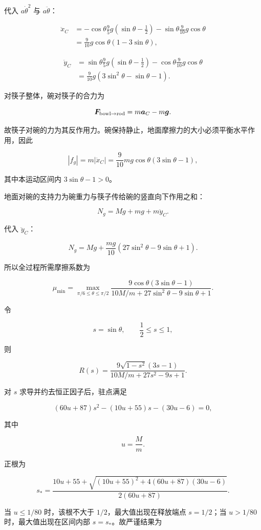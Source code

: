 \documentclass[12pt,a4paper,UTF8]{ctexart}
\begin{document}
代入 \(a\dot\theta^2\) 与 \(a\ddot\theta\)：

\[\begin{aligned}
\ddot x_C
&=-\cos\theta\frac95g\left(\sin\theta-\frac12\right)
-\sin\theta\frac9{10}g\cos\theta\\
&=\frac9{10}g\cos\theta(1-3\sin\theta),
\end{aligned}\]

\[\begin{aligned}
\ddot y_C
&=\sin\theta\frac95g\left(\sin\theta-\frac12\right)
-\cos\theta\frac9{10}g\cos\theta\\
&=\frac9{10}g(3\sin^2\theta-\sin\theta-1).
\end{aligned}\]

对筷子整体，碗对筷子的合力为

\[\bm F_{\rm bowl\to rod}=m\bm a_C-m\bm g.\]

故筷子对碗的力为其反作用力。碗保持静止，地面摩擦力的大小必须平衡水平作用，因此

\[|f_g|=m|\ddot x_C|
=\frac9{10}mg\cos\theta(3\sin\theta-1),\]

其中本运动区间内 \(3\sin\theta-1>0\)。

地面对碗的支持力为碗重力与筷子传给碗的竖直向下作用之和：

\[N_g=Mg+mg+m\ddot y_C.\]

代入 \(\ddot y_C\)：

\[\boxed{
N_g=Mg+\frac{mg}{10}\left(27\sin^2\theta-9\sin\theta+1\right)
}.\]

所以全过程所需摩擦系数为

\[\mu_{\min}=\max_{\pi/6\le\theta\le\pi/2}
\frac{9\cos\theta(3\sin\theta-1)}
{10M/m+27\sin^2\theta-9\sin\theta+1}.\]

令

\[s=\sin\theta,\qquad \frac12\le s\le1,\]

则

\[R(s)=\frac{9\sqrt{1-s^2}(3s-1)}{10M/m+27s^2-9s+1}.\]

对 \(s\) 求导并约去恒正因子后，驻点满足

\[(60u+87)s^2-(10u+55)s-(30u-6)=0,\]

其中

\[u=\frac{M}{m}.\]

正根为

\[s_*=\frac{10u+55+\sqrt{(10u+55)^2+4(60u+87)(30u-6)}}{2(60u+87)}.\]

当 \(u\le1/80\) 时，该根不大于 \(1/2\)，最大值出现在释放端点
\(s=1/2\)；当 \(u>1/80\) 时，最大值出现在区间内部
\(s=s_*\)。故严谨结果为
\end{document}
